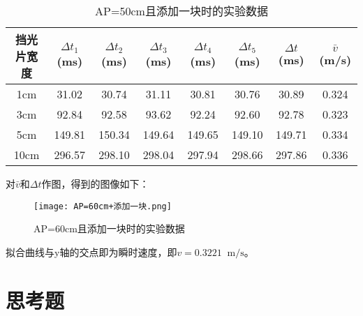\documentclass[11pt]{article}
\newcommand*{\unit}[1]{\mathop{}\!\mathrm{#1}}
\begin{document}
\begin{table}[H]
    \centering
    \caption{AP=50cm且添加一块时的实验数据}
    \begin{tabular}{|c|c|c|c|c|c|c|c|}
        \hline
        挡光片宽度&$\Delta t_1$(ms)&$\Delta t_2$(ms)&$\Delta t_3$(ms)&$\Delta t_4$(ms)&$\Delta t_5$(ms)&$\Delta t$(ms)&$\bar{v}$(m/s)\\
        \hline
        1cm&31.02  & 30.74  & 31.11  & 30.81  & 30.76  & 30.89  & 0.324      \\
        \hline
        3cm&92.84  & 92.58  & 93.62  & 92.24  & 92.60  & 92.78  & 0.323      \\
        \hline
        5cm&149.81  & 150.34  & 149.64  & 149.65  & 149.10  & 149.71  & 0.334      \\
        \hline
        10cm&296.57  & 298.10  & 298.04  & 297.94  & 298.66  & 297.86  & 0.336    \\
        \hline
    \end{tabular}
\end{table}

对$\bar{v}$和$\Delta t$作图，得到的图像如下：

\begin{figure}[H]
    \centering
    \texttt{[image: AP=60cm+添加一块.png]}
    \caption{AP=60cm且添加一块时的实验数据}
\end{figure}

拟合曲线与y轴的交点即为瞬时速度，即$v=0.3221 \unit{m/s}$。

\section{思考题}
\end{document}
